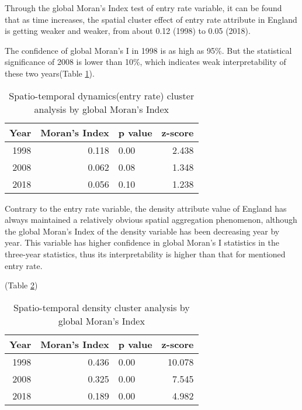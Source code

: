 \documentclass[
  12pt,
  oneside]{book}
\begin{document}
Through the global Moran's Index test of entry rate variable, it can be found that as time increases, the spatial cluster effect of entry rate attribute in England is getting weaker and weaker, from about 0.12 (1998) to 0.05 (2018).

The confidence of global Moran's I in 1998 is as high as 95\%. But the statistical significance of 2008 is lower than 10\%, which indicates weak interpretability of these two years(Table \ref{tab:tab-morans-i-enR}).

\begin{table}

\caption{\label{tab:tab-morans-i-enR}Spatio-temporal dynamics(entry rate) cluster analysis by global Moran's Index}
\centering
\begin{tabular}[t]{rrlr}
\toprule
\textbf{Year} & \textbf{Moran’s Index} & \textbf{p value} & \textbf{z-score}\\
\midrule
1998 & 0.118 & 0.00 & 2.438\\
2008 & 0.062 & 0.08 & 1.348\\
2018 & 0.056 & 0.10 & 1.238\\
\bottomrule
\end{tabular}
\end{table}

Contrary to the entry rate variable, the density attribute value of England has always maintained a relatively obvious spatial aggregation phenomenon, although the global Moran's Index of the density variable has been decreasing year by year. This variable has higher confidence in global Moran's I statistics in the three-year statistics, thus its interpretability is higher than that for mentioned entry rate.

(Table \ref{tab:tab-morans-i-den})

\begin{table}

\caption{\label{tab:tab-morans-i-den}Spatio-temporal density cluster analysis by global Moran's Index}
\centering
\begin{tabular}[t]{rrlr}
\toprule
\textbf{Year} & \textbf{Moran’s Index} & \textbf{p value} & \textbf{z-score}\\
\midrule
1998 & 0.436 & 0.00 & 10.078\\
2008 & 0.325 & 0.00 & 7.545\\
2018 & 0.189 & 0.00 & 4.982\\
\bottomrule
\end{tabular}
\end{table}
\end{document}
